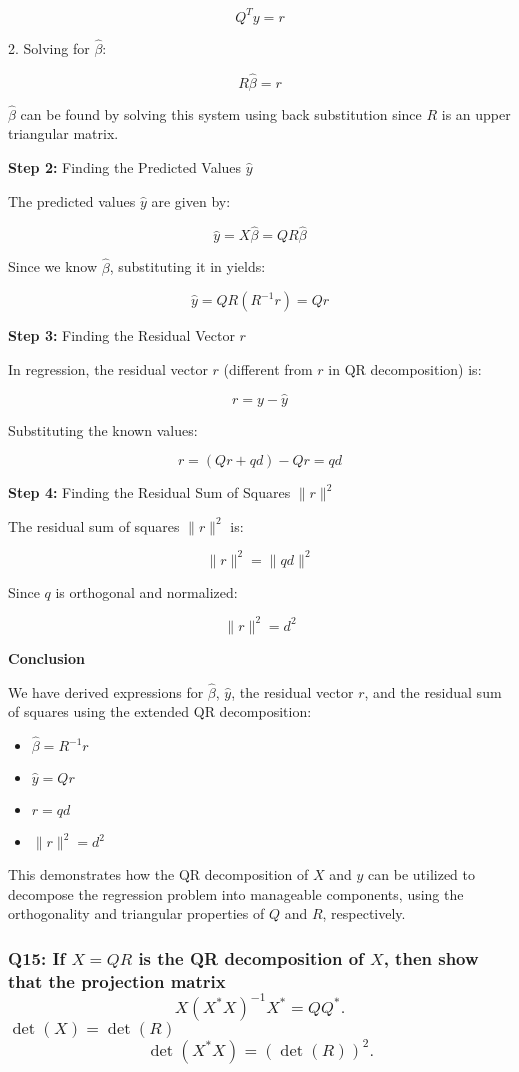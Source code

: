 \documentclass{article}
\begin{document}
\[ Q^T y = r \]

2. Solving for \(\hat{\beta}\):

\[ R\hat{\beta} = r \]

\(\hat{\beta}\) can be found by solving this system using back substitution since \( R \) is an upper triangular matrix.

\textbf{Step 2:} Finding the Predicted Values \(\hat{y}\)

The predicted values \(\hat{y}\) are given by:

\[ \hat{y} = X\hat{\beta} = QR\hat{\beta} \]

Since we know \(\hat{\beta}\), substituting it in yields:

\[ \hat{y} = QR(R^{-1}r) = Qr \]

\textbf{Step 3: }Finding the Residual Vector \(r\)

In regression, the residual vector \(r\) (different from \(r\) in QR decomposition) is:

\[ r = y - \hat{y} \]

Substituting the known values:

\[ r = (Qr + qd) - Qr = qd \]

\textbf{Step 4:} Finding the Residual Sum of Squares \(\|r\|^2\)

The residual sum of squares \(\|r\|^2\) is:

\[ \|r\|^2 = \|qd\|^2 \]

Since \( q \) is orthogonal and normalized:

\[ \|r\|^2 = d^2 \]

\textbf{Conclusion}

We have derived expressions for \(\hat{\beta}\), \(\hat{y}\), the residual vector \(r\), and the residual sum of squares using the extended QR decomposition:

\begin{itemize}
    \item \(\hat{\beta} = R^{-1}r\)
    \item \(\hat{y} = Qr\)
    \item \(r = qd\)
    \item \(\|r\|^2 = d^2\)
\end{itemize}

This demonstrates how the QR decomposition of \(X\) and \(y\) can be utilized to decompose the regression problem into manageable components, using the orthogonality and triangular properties of \(Q\) and \(R\), respectively.

\subsubsection*{Q15: If \(X = QR\) is the QR decomposition of \(X\), then show that the projection matrix
\[ X(X^* X)^{-1}X^* = QQ^*. \]
 \(\det(X) = \det(R)\) 
\[ \det(X^* X) = (\det(R))^2. \]}
\end{document}
